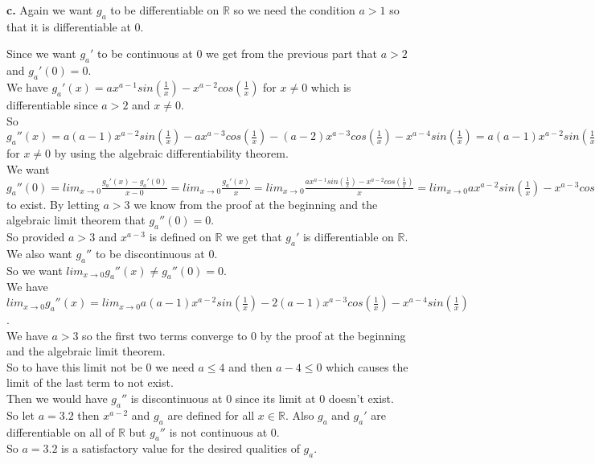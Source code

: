 \documentclass{article}
\begin{document}
{\Large\textbf{c.}} Again we want $g_a$ to be differentiable on $\mathbb{R}$ so we need the condition $a > 1$ so that it is differentiable at 0.
\begin{center}
    \doublespacing
    Since we want $g_a '$ to be continuous at 0 we get from the previous part that $a > 2$ and $g_a '(0) = 0$.
    \\We have $g_a '(x) = a x^{a-1} sin(\frac{1}{x}) - x^{a-2} cos(\frac{1}{x})$ for $x\neq 0$ which is differentiable since $a > 2$ and $x\neq 0$.
    \\So $g_a ''(x) = a (a-1) x^{a-2} sin(\frac{1}{x}) - a x^{a-3} cos(\frac{1}{x}) - (a-2) x^{a-3} cos(\frac{1}{x}) - x^{a-4} sin(\frac{1}{x}) = a (a-1) x^{a-2} sin(\frac{1}{x}) - 2(a-1) x^{a-3} cos(\frac{1}{x}) - x^{a-4} sin(\frac{1}{x})$ for $x\neq 0$ by using the algebraic differentiability theorem.
    \\We want $g_a ''(0) = lim_{x\rightarrow 0}\frac{g_a '(x) - g_a '(0)}{x - 0} = lim_{x\rightarrow 0}\frac{g_a '(x)}{x} = lim_{x\rightarrow 0}\frac{a x^{a-1} sin(\frac{1}{x}) - x^{a-2} cos(\frac{1}{x})}{x} = lim_{x\rightarrow 0} a x^{a-2} sin(\frac{1}{x}) - x^{a-3} cos(\frac{1}{x})$ to exist. By letting $a > 3$ we know from the proof at the beginning and the algebraic limit theorem that $g_a ''(0) = 0$.
    \\So provided $a > 3$ and $x^{a-3}$ is defined on $\mathbb{R}$ we get that $g_a '$ is differentiable on $\mathbb{R}$.
    \\We also want $g_a ''$ to be discontinuous at 0.
    \\So we want $lim_{x\rightarrow 0} g_a ''(x)\neq g_a ''(0) = 0$.
    \\We have $lim_{x\rightarrow 0} g_a ''(x) = lim_{x\rightarrow 0} a (a-1) x^{a-2} sin(\frac{1}{x}) - 2(a-1) x^{a-3} cos(\frac{1}{x}) - x^{a-4} sin(\frac{1}{x})$.
    \\We have $a > 3$ so the first two terms converge to 0 by the proof at the beginning and the algebraic limit theorem.
    \\So to have this limit not be 0 we need $a\leq 4$ and then $a - 4\leq 0$ which causes the limit of the last term to not exist.
    \\Then we would have $g_a ''$ is discontinuous at 0 since its limit at 0 doesn't exist.
    \\So let $a = 3.2$ then $x^{a-2}$ and $g_a$ are defined for all $x\in\mathbb{R}$. Also $g_a$ and $g_a '$ are differentiable on all of $\mathbb{R}$ but $g_a ''$ is not continuous at 0.
    \\So $a = 3.2$ is a satisfactory value for the desired qualities of $g_a$.
\end{center}
 
\end{document}
